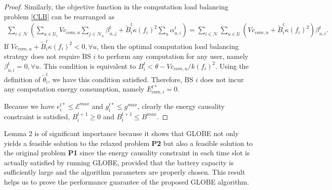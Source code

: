 \documentclass[12pt, draftclsnofoot, letterpaper, onecolumn]{IEEEtran}
\begin{document}
{\begin{proof}
Similarly, the objective function in the computation load balancing problem \eqref{CLB} can be rearranged as
\begin{align}
\sum_{i\in\mathcal{N}}\left(\sum_{u\in\mathcal{U}_i}Vc_{com,u}\sum_{j\in\mathcal{N}_u}\beta^t_{u,j} + \tilde{B}^t_i \kappa (f_i)^2\sum_u \alpha^t_{u,i} \right)
= \sum_{i\in\mathcal{N}}\sum_{u\in\mathcal{U}}(Vc_{com,u} +\tilde{B}^t_i\kappa(f_i)^2)\beta^t_{u,i}.
\end{align}
If $Vc_{com,u} +\tilde{B}^t_i\kappa(f_i)^2 < 0, \forall u$, then the optimal computation load balancing strategy does not require BS $i$ to perform any computation for any user, namely $\beta^t_{u,i} = 0, \forall u$. This condition is equivalent to $B^t_i < \theta - Vc_{com,u}/k(f_i)^2$. Using the definition of $\tilde{\theta}^t_i$, we  have this condition satisfied. Therefore, BS $i$ does not incur any computation energy consumption, namely $E^{t*}_{com,i} = 0$.

Because we have $e^{t*}_i \leq \mathcal{E}^{max}$ and $g^{t*}_i \leq g^{max}$, clearly the energy causality constraint is satisfied, $B^{t+1}_i \geq 0$ and $B^{t+1}_i \leq B^{max}$.
\end{proof}

Lemma 2 is of significant importance because it shows that GLOBE not only yields a feasible solution to the relaxed problem \textbf{P2} but also a feasible solution to the original problem \textbf{P1} since the energy causality constraint in each time slot is actually satisfied by running GLOBE, provided that the battery capacity is sufficiently large and the algorithm parameters are properly chosen. This result helps us to prove the performance guarantee of the proposed GLOBE algorithm.

}
\end{document}
